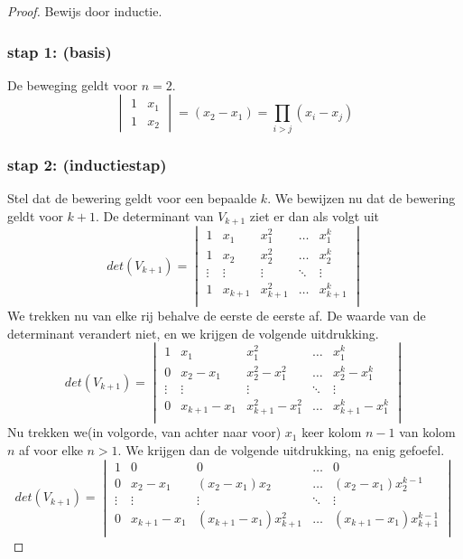 \documentclass[lineaire_algebra_oplossingen.tex]{subfiles}
\begin{document}
\begin{proof}
Bewijs door inductie.\\
\subsubsection*{stap 1: (basis)}
De beweging geldt voor $n=2$.
\[
\begin{vmatrix}
1 & x_1\\
1 & x_2
\end{vmatrix}
=
(x_2-x_1) = \prod_{i>j}(x_i-x_j)
\]
\subsubsection*{stap 2: (inductiestap)}
Stel dat de bewering geldt voor een bepaalde $k$. We bewijzen nu dat de bewering geldt voor $k+1$.
De determinant van $V_{k+1}$ ziet er dan als volgt uit
\[
det(V_{k+1}) =
\begin{vmatrix}
1 & x_1 & x_1^2 & \hdots & x_1^{k}\\
1 & x_2 & x_2^2 & \hdots & x_2^{k}\\
\vdots &\vdots &\vdots & \ddots & \vdots \\
1 & x_{k+1} & x_{k+1}^2 & \hdots & x_{k+1}^{k}\\
\end{vmatrix}
\]
We trekken nu van elke rij behalve de eerste de eerste af. De waarde van de determinant verandert niet, en we krijgen de volgende uitdrukking.
\[
det(V_{k+1}) =
\begin{vmatrix}
1 & x_1 & x_1^2 & \hdots & x_1^{k}\\
0 & x_2-x_1 & x_2^2-x_1^2 & \hdots & x_2^{k}-x_1^{k}\\
\vdots &\vdots &\vdots & \ddots & \vdots \\
0 & x_{k+1}-x_1 & x_{k+1}^2-x_1^2  & \hdots & x_{k+1}^{k}-x_1^{k}\\
\end{vmatrix}
\]
Nu trekken we(in volgorde, van achter naar voor) $x_1$ keer kolom $n-1$ van kolom $n$ af voor elke $n > 1$. We krijgen dan de volgende uitdrukking, na enig gefoefel.
\[
det(V_{k+1}) =
\begin{vmatrix}
1 & 0 & 0 & \hdots & 0\\
0 & x_2-x_1 & (x_2-x_1)x_2 & \hdots & (x_2-x_1)x_2^{k-1}\\
\vdots &\vdots &\vdots & \ddots & \vdots \\
0 & x_{k+1}-x_1 & (x_{k+1}-x_1)x_{k+1}^2  & \hdots & (x_{k+1}-x_1)x_{k+1}^{k-1}\\

\end{vmatrix}\]
\end{proof}
\end{document}
